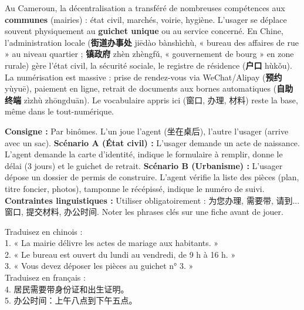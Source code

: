 \documentclass[11pt]{article}
\begin{document}
\begin{savaistu}
Au Cameroun, la décentralisation a transféré de nombreuses compétences aux \textbf{communes} (mairies) : état civil, marchés, voirie, hygiène. L'usager se déplace souvent physiquement au \textbf{guichet unique} ou au service concerné. En Chine, l'administration locale (\textbf{街道办事处} jiēdào bànshìchù, « bureau des affaires de rue » au niveau quartier ; \textbf{镇政府} zhèn zhèngfǔ, « gouvernement de bourg » en zone rurale) gère l'état civil, la sécurité sociale, le registre de résidence (\textbf{户口} hùkǒu). La numérisation est massive : prise de rendez-vous via WeChat/Alipay (\textbf{预约} yùyuē), paiement en ligne, retrait de documents aux bornes automatiques (\textbf{自助终端} zìzhù zhōngduān). Le vocabulaire appris ici (窗口, 办理, 材料) reste la base, même dans le tout-numérique.
\end{savaistu}

\begin{experience}
\textbf{Consigne :} Par binômes. L'un joue l'agent (坐在桌后), l'autre l'usager (arrive avec un sac).
\textbf{Scénario A (État civil) :} L'usager demande un acte de naissance. L'agent demande la carte d'identité, indique le formulaire à remplir, donne le délai (3 jours) et le guichet de retrait.
\textbf{Scénario B (Urbanisme) :} L'usager dépose un dossier de permis de construire. L'agent vérifie la liste des pièces (plan, titre foncier, photos), tamponne le récépissé, indique le numéro de suivi.
\textbf{Contraintes linguistiques :} Utiliser obligatoirement : 为您办理, 需要带, 请到...窗口, 提交材料, 办公时间. Noter les phrases clés sur une fiche avant de jouer.
\end{experience}

\begin{exercice}
Traduisez en chinois :\\
1. « La mairie délivre les actes de mariage aux habitants. »\\
2. « Le bureau est ouvert du lundi au vendredi, de 9 h à 16 h. »\\
3. « Vous devez déposer les pièces au guichet n° 3. »\\
Traduisez en français :\\
4. 居民需要带身份证和出生证明。\\
5. 办公时间：上午八点到下午五点。
\end{exercice}
\end{document}
